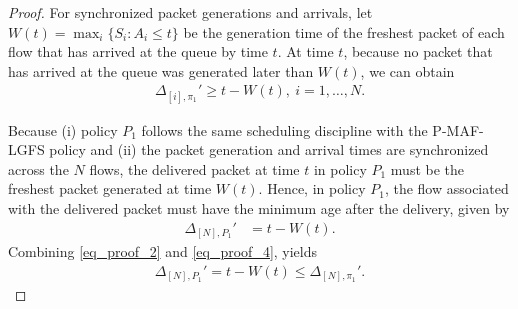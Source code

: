 \ifreport
\begin{proof}
For synchronized packet generations and arrivals, let $W(t) = \max_i\{S_i: A_i \leq t\}$ 
be the generation time of the freshest packet of each flow that has arrived at the queue by time $t$. At time $t$, because no packet that has arrived at the queue was generated later than $W(t)$, we can obtain
\begin{align}%
\Delta_{[i],\pi_1}' \geq t  -W(t),~i=1,\ldots,N.\label{eq_proof_2}
\end{align} 

Because (i) policy $P_1$ follows the same scheduling discipline with the P-MAF-LGFS policy and (ii) the packet generation and arrival times are {synchronized} across the $N$ flows, the delivered packet at time $t$ in policy $P_1$ must be the freshest packet generated at time $W(t)$. Hence, in policy $P_1$, the flow associated with the delivered packet must have the minimum age after the delivery, given by
\begin{align}
\Delta_{[N],P_1}' &= t - W(t). \label{eq_proof_4}
\end{align}
Combining \eqref{eq_proof_2} and \eqref{eq_proof_4}, yields
\begin{align}
\Delta_{[N],P_1}' = t - W(t) \leq \Delta_{[N],\pi_1}'. \label{eq_proof_5}
\end{align}


\end{proof}
